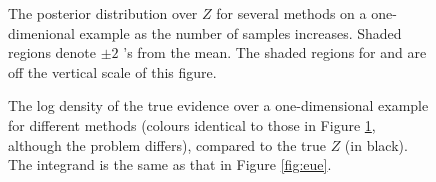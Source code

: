 \documentclass{article}
\begin{document}
% 
% 
% 
% 

\begin{figure}
	\caption{The posterior distribution over $Z$ for several methods on a one-dimenional example as the number of samples increases.  Shaded regions denote $\pm2$ 's from the mean.  The shaded regions for  and  are off the vertical scale of this figure.}
\label{fig:se}
\end{figure}

\begin{figure}
	\centering
	\caption{The log density of the true evidence over a one-dimensional example for different methods (colours identical to those in Figure \ref{fig:se}, although the problem differs), compared to the true $Z$ (in black).  The integrand is the same as that in Figure \ref{fig:eue}.}
\label{fig:nll}
\end{figure}




\end{document}
